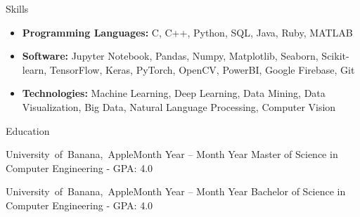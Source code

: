 \documentclass[]{../mcdowellcv}
\begin{document}
\begin{cvsection}{Skills}
    \begin{cvsubsection}{}{}{}
        \begin{itemize}
            \item \textbf{Programming Languages:} C, C++, Python, SQL, Java, Ruby, MATLAB
            \item \textbf{Software:} Jupyter Notebook, Pandas, Numpy, Matplotlib, Seaborn, Scikit-learn, TensorFlow, Keras, PyTorch, OpenCV, PowerBI, Google Firebase, Git
            \item \textbf{Technologies:} Machine Learning, Deep Learning, Data Mining, Data Visualization, Big Data, Natural Language Processing, Computer Vision
        \end{itemize}
    \end{cvsubsection}
\end{cvsection}

\begin{cvsection}{Education}

    \begin{cvsubsection}{\mbox {University of Banana, Apple}}{}{Month Year -- Month Year}
        Master of Science in Computer Engineering - GPA: 4.0
    \end{cvsubsection}
    
    \begin{cvsubsection}{\mbox {University of Banana, Apple}}{}{Month Year -- Month Year}
        Bachelor of Science in Computer Engineering - GPA: 4.0
    \end{cvsubsection}
     
\end{cvsection}
\end{document}
